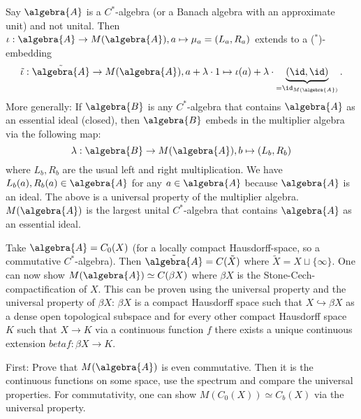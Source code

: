 \documentclass[a4paper]{article}
\begin{document}
Say $\algebra{A}$ is a $C^*$-algebra (or a Banach algebra with an approximate unit) and not unital.
Then $\iota: \algebra{A} \to M(\algebra{A}), a \mapsto \mu_a = (L_a, R_a)$ extends to a ($^*$)-embedding 
\begin{equation*}
	\tilde{\iota}: \tilde{\algebra{A}} \to M(\algebra{A}), a + \lambda \cdot 1 \mapsto \iota(a) + \lambda \cdot \underbrace{(\id, \id)}_{= \id_{M(\algebra{A})}}\text{.}
\end{equation*}
More generally: If $\algebra{B}$ is any  $C^*$-algebra that contains $\algebra{A}$ as an essential ideal (closed), then $\algebra{B}$ embeds in the multiplier algebra via the following map:
\begin{equation*}
	\lambda: \algebra{B} \to M(\algebra{A}), b \mapsto (L_b, R_b)
\end{equation*}
where $L_b, R_b$ are the usual left and right multiplication.
We have $L_b(a), R_b(a) \in \algebra{A}$ for any $a \in \algebra{A}$ because $\algebra{A}$ is an ideal.
The above is a universal property of the multiplier algebra.
$M(\algebra{A})$ is the largest unital $C^*$-algebra that contains $\algebra{A}$ as an essential ideal.

\begin{example}
	Take $\algebra{A} = C_0(X)$ (for a locally compact Hausdorff-space, so a commutative $C^*$-algebra).
	Then $\tilde{\algebra{A}} = C(\tilde{X})$ where $\tilde{X} = X \sqcup \{\infty\}$.
	One can now show $M(\algebra{A}) \simeq C(\beta X)$ where $\beta X$ is the Stone-Cech-compactification of $X$.
	This can be proven using the universal property and the universal property of $\beta X$:
	$\beta X$ is a compact Hausdorff space such that $X \hookrightarrow \beta X$ as a dense open topological subspace and for every other compact Hausdorff space $K$ such that $X \to K$ via a continuous function $f$ there exists a unique continuous extension $beta f: \beta X \to K$.

	First: Prove that $M(\algebra{A})$ is even commutative.
	Then it is the continuous functions on some space, use the spectrum and compare the universal properties.
	For commutativity, one can show $M(C_0(X)) \simeq C_b(X)$ via the universal property.
\end{example}
\end{document}
